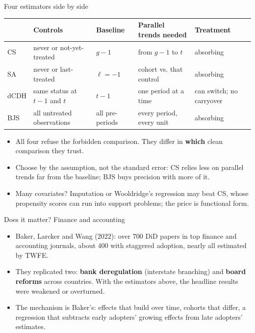 \documentclass[
  11pt,
  ignorenonframetext,
  aspectratio=169,
]{beamer}
\providecommand{\tightlist}{%
  \setlength{\itemsep}{0pt}\setlength{\parskip}{0pt}}
\begin{document}
\begin{frame}{Four estimators side by side}
\protect{}\label{four-estimators-side-by-side}
\begin{center}\scriptsize
\begin{tabular}{lllll}
\toprule
 & Controls & Baseline & Parallel trends needed & Treatment \\
\midrule
CS & never or not-yet-treated & $g - 1$ & from $g - 1$ to $t$ & absorbing \\
SA & never or last-treated & $\ell = -1$ & cohort vs. that control & absorbing \\
dCDH & same status at $t-1$ and $t$ & $t - 1$ & one period at a time & can switch; no carryover \\
BJS & all untreated observations & all pre-periods & every period, every unit & absorbing \\
\bottomrule
\end{tabular}
\end{center}

\begin{itemize}
\tightlist
\item
  All four refuse the forbidden comparison. They differ in
  \textbf{which} clean comparison they trust.
\item
  Choose by the assumption, not the standard error: CS relies less on
  parallel trends far from the baseline; BJS buys precision with more of
  it.
\item
  Many covariates? Imputation or Wooldridge's regression may beat CS,
  whose propensity scores can run into support problems; the price is
  functional form.
\end{itemize}
\end{frame}

\begin{frame}{Does it matter? Finance and accounting}
\protect{}\label{does-it-matter-finance-and-accounting}
\begin{itemize}
\tightlist
\item
  Baker, Larcker and Wang (2022): over \(700\) DiD papers in top finance
  and accounting journals, about \(400\) with staggered adoption, nearly
  all estimated by TWFE.
\item
  They replicated two: \textbf{bank deregulation} (interstate branching)
  and \textbf{board reforms} across countries. With the estimators
  above, the headline results were weakened or overturned.
\item
  The mechanism is Baker's: effects that build over time, cohorts that
  differ, a regression that subtracts early adopters' growing effects
  from late adopters' estimates.
\end{itemize}
\end{frame}
\end{document}
